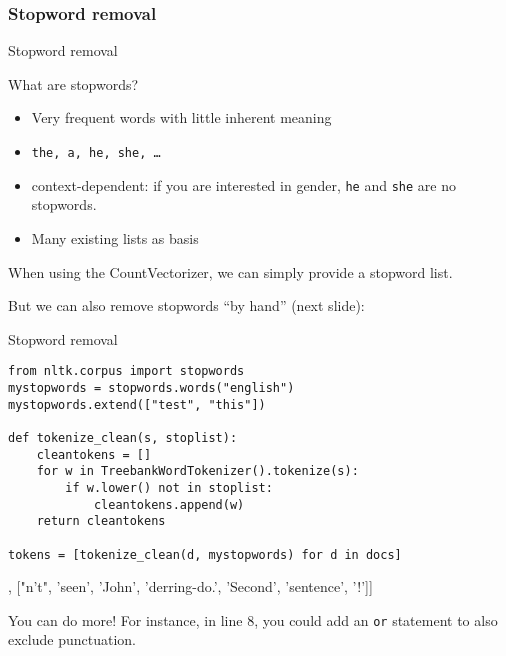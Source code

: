 \subsubsection{Stopword removal}



\begin{frame}{Stopword removal}
	\begin{block}{What are stopwords?}
		\begin{itemize}
			\item Very frequent words with little inherent meaning
			\item \texttt{the, a, he, she, \ldots}
			\item context-dependent: if you are interested in gender, \texttt{he} and \texttt{she} are no stopwords. 
			\item Many existing lists as basis
		\end{itemize}
	\end{block}

When using the CountVectorizer, we can simply provide a stopword list. 

But we can also remove stopwords ``by hand'' (next slide):
\end{frame}

\begin{frame}[fragile]{Stopword removal}
\begin{lstlisting}
from nltk.corpus import stopwords
mystopwords = stopwords.words("english")
mystopwords.extend(["test", "this"])

def tokenize_clean(s, stoplist):
    cleantokens = []
    for w in TreebankWordTokenizer().tokenize(s):
        if w.lower() not in stoplist:
            cleantokens.append(w)
    return cleantokens

tokens = [tokenize_clean(d, mystopwords) for d in docs]
\end{lstlisting}
\begin{lstlistingoutputtiny}
[['text'], ["n't", 'seen', 'John', 'derring-do.', 'Second', 'sentence', '!']]
\end{lstlistingoutputtiny}

\begin{alertblock}{You can do more!}
For instance, in line 8, you could add an \texttt{or} statement to also exclude punctuation.
\end{alertblock}

\end{frame}





